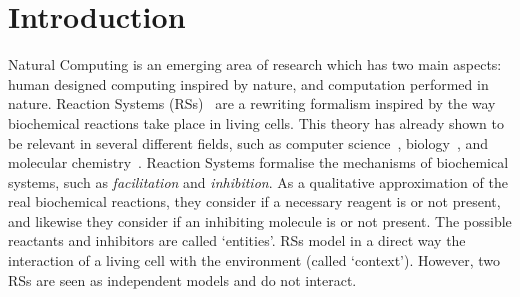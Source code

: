 
\section{Introduction}

Natural Computing is an emerging area of research which has two main 
aspects: human designed computing inspired by nature, and computation 
performed in nature. Reaction Systems (RSs)~\cite{BEMR11} are a 
rewriting formalism
inspired by the way biochemical reactions take place in living 
cells.  
This theory has already shown to be relevant in several different 
fields, such as computer science~\cite{MPR15}, 
biology~\cite{ABP14,CMMBM12,Az17,BarbutiGLM16}, and
molecular chemistry~\cite{OY16}.
Reaction Systems formalise the mechanisms of biochemical systems, 
such as {\em facilitation} and {\em inhibition}. 
As a qualitative approximation of the real biochemical reactions, they
consider if a necessary reagent is or not present, and likewise they
consider if an inhibiting molecule is or not present. 
The  possible reactants and inhibitors are called `entities'.
RSs model in a direct way the interaction of a living cell
with the environment (called `context'). However, two RSs are seen
as independent models and do not interact.


